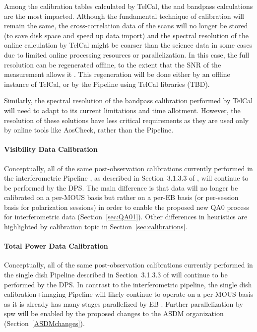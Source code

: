 Among the calibration tables calculated by TelCal, the \Tsys\/ and bandpass calculations are the most impacted.
Although the fundamental technique of \Tsys\/ calibration will remain the same, the cross-correlation data of the \Tsys\/ scans will no longer be stored (to save disk space and speed up data import) and
the spectral resolution of the online calculation by TelCal might be coarser than
the science data in some cases due to limited online processing resources or parallelization.
In this case, the full resolution can be regenerated offline, to the extent
that the SNR of the measurement allows it \cite{normalizationAndTsys}.  This regeneration will be done
either by an offline instance of TelCal, or by the Pipeline using TelCal libraries (TBD). 

Similarly, the spectral resolution of the bandpass calibration
performed by TelCal will need to adapt to its current limitations and time allotment.  However, the resolution of these solutions have less 
critical requirements as they are used only by online tools like AosCheck, rather than the Pipeline.

\paragraph{Visibility Data Calibration}  
Conceptually, all of the same post-observation calibrations currently performed in the interferometric Pipeline \cite{ALMApipelineHeuristics}, as described in Section~3.1.3.3 of \cite{CSA-IA}, will continue to be performed by the DPS.  The main difference is that data will no longer be calibrated on a per-MOUS basis but rather on a per-EB basis (or per-session basis for polarization sessions) \cite{dp} in order to enable the proposed new QA0 process for interferometric data (Section~\ref{sec:QA01}). Other differences in heuristics are highlighted by calibration topic 
in Section~\ref{sec:calibrations}.

\paragraph{Total Power Data Calibration}
Conceptually, all of the same post-observation calibrations currently performed in the single dish Pipeline described in Section~3.1.3.3 of \cite{CSA-IA} will continue to be performed by the DPS.  In contrast to the interferometric pipeline, the single dish calibration+imaging Pipeline will likely continue to operate on a per-MOUS basis as it is already has many stages parallelized by EB \cite{dp}.  Further parallelization by spw will be enabled by the proposed changes to the ASDM organization (Section~\ref{ASDMchanges}).

